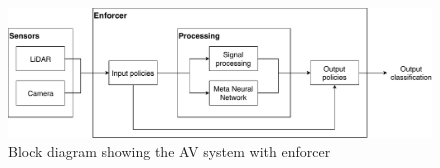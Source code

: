 \begin{figure}[t]
	\centering
	\includegraphics[scale=0.6]{Content/fig/SSNN.pdf}
	\caption{Block diagram showing the \acf{AV} system with enforcer}
	\label{fig:ssnn}
\end{figure}






















